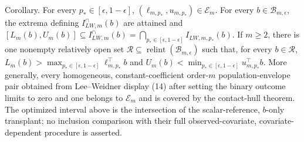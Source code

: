 Corollary. For every \(p_*\in[\epsilon,1-\epsilon]\), \((\ell_{m,p_*},u_{m,p_*})\in\mathcal E_m\). For every \(b\in\mathcal B_{m,\epsilon}\), the extrema defining \(I_{LW,m}^{\cap}(b)\) are attained and \([L_m(b),U_m(b)]\subseteq I_{LW,m}^{\cap}(b)=\bigcap_{p_*\in[\epsilon,1-\epsilon]}I_{LW,m,p_*}(b)\). If \(m\ge2\), there is one nonempty relatively open set \(\mathcal R\subseteq\operatorname{relint}(\mathcal B_{m,\epsilon})\) such that, for every \(b\in\mathcal R\), \(L_m(b)>\max_{p_*\in[\epsilon,1-\epsilon]}\ell_{m,p_*}^{\top}b\) and \(U_m(b)<\min_{p_*\in[\epsilon,1-\epsilon]}u_{m,p_*}^{\top}b\). More generally, every homogeneous, constant-coefficient order-\(m\) population-envelope pair obtained from Lee--Weidner display (14) after setting the binary outcome limits to zero and one belongs to \(\mathcal E_m\) and is covered by the contact-hull theorem. The optimized interval above is the intersection of the scalar-reference, \(b\)-only transplant; no inclusion comparison with their full observed-covariate, covariate-dependent procedure is asserted.